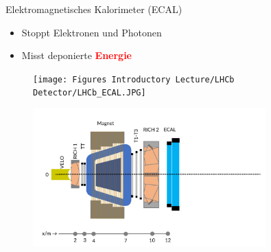 \begin{frame}{Elektromagnetisches Kalorimeter (ECAL)}
    \begin{minipage}{0.58\textwidth}
    \begin{itemize}
        \item Stoppt Elektronen und Photonen
        \item Misst deponierte \textcolor{red}{\textbf{Energie}}
    \end{itemize}
    \end{minipage}\hfill
    \begin{minipage}{0.38\textwidth}
        \begin{figure}[h]
        \centering
        \texttt{[image: Figures Introductory Lecture/LHCb Detector/LHCb\_ECAL.JPG]}%
        \end{figure}
    \end{minipage}
    \vspace{-0.5cm}
    \begin{figure}[h]
    \centering
    \includegraphics[width=0.8\textwidth]{Figures Introductory Lecture/LHCb Detector/LHCb_7_DE.png}
    \end{figure}
\end{frame}
